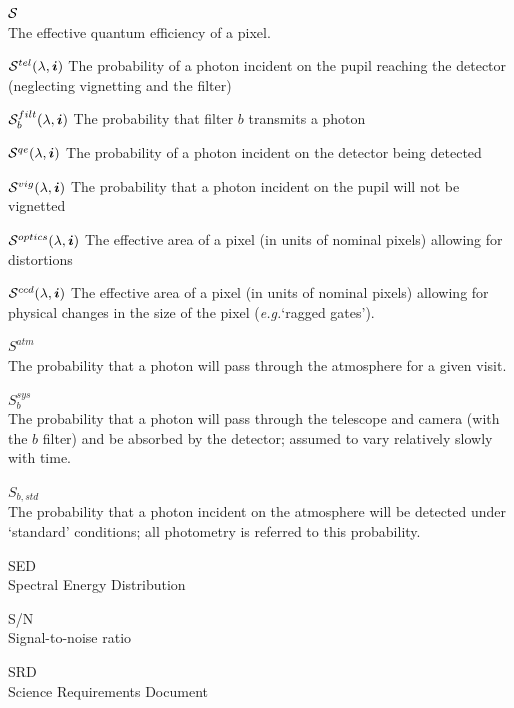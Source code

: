 \documentclass[12pt]{article}
\newcommand{\eg}{\textit{e.g.}\xspace}
\newcommand{\ib}{{\boldsymbol i}}
\newcommand{\qe}{{\cal S}}
\begin{document}
\begin{description}
  \item $\qe$\\
    The effective quantum efficiency of a pixel.
    \begin{description}
    \item $\qe^{tel}(\lambda, \ib)$
      The probability of a photon incident on the pupil reaching the detector (neglecting vignetting
      and the filter)
    \item $\qe_b^{filt}(\lambda, \ib)$
      The probability that filter $b$ transmits a photon
    \item $\qe^{qe}(\lambda, \ib)$
      The probability of a photon incident on the detector being detected
    \item $\qe^{vig}(\lambda, \ib)$
      The probability that a photon incident on the pupil will not be vignetted
    \item $\qe^{optics}(\lambda, \ib)$
      The effective area of a pixel (in units of nominal pixels) allowing for distortions
    \item $\qe^{ccd}(\lambda, \ib)$
      The effective area of a pixel (in units of nominal pixels) allowing for physical changes
      in the size of the pixel (\eg `ragged gates').
    \end{description}

  \item $S^{atm}$\\
    The probability that a photon will pass through the atmosphere for a given visit.

  \item $S_b^{sys}$\\
    The probability that a photon will pass through the telescope and camera (with the $b$ filter)
    and be absorbed by the detector;  assumed to vary relatively slowly with time.

  \item $S_{b, std}$\\
    The probability that a photon incident on the atmosphere will be detected under `standard' conditions; all
    photometry is referred to this probability.

  \item{SED}\\
    Spectral Energy Distribution

  \item{S/N}\\
    Signal-to-noise ratio

  \item{SRD}\\
    Science Requirements Document


\end{description}
\end{document}
